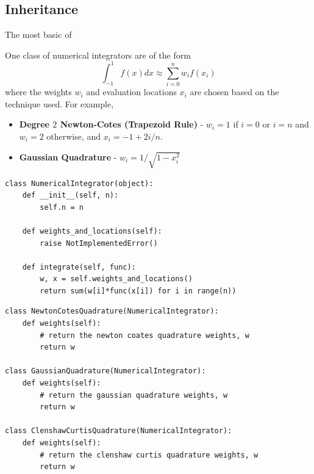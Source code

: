 \begin{lstlisting}
\end{lstlisting}


\subsection{Inheritance}

The most basic of

One class of numerical integrators are of the form
\[
  \int_{-1}^1 f(x) dx \approx \sum_{i=0}^n w_i f(x_i)
\]
where the weights $w_i$ and evaluation locations $x_i$ are chosen based on the
technique used. For example,
\begin{itemize}
\item {\bf Degree $2$ Newton-Cotes (Trapezoid Rule)} - $w_i = 1$ if $i=0$ or
  $i=n$ and $w_i = 2$ otherwise, and $x_i = -1 + 2i/n$.
  \item {\bf Gaussian Quadrature} - $w_i = 1/\sqrt{1-x_i^2}$
\end{itemize}

\begin{lstlisting}
class NumericalIntegrator(object):
    def __init__(self, n):
        self.n = n

    def weights_and_locations(self):
        raise NotImplementedError()

    def integrate(self, func):
        w, x = self.weights_and_locations()
        return sum(w[i]*func(x[i]) for i in range(n))
\end{lstlisting}


\begin{lstlisting}
class NewtonCotesQuadrature(NumericalIntegrator):
    def weights(self):
        # return the newton coates quadrature weights, w
        return w

class GaussianQuadrature(NumericalIntegrator):
    def weights(self):
        # return the gaussian quadrature weights, w
        return w

class ClenshawCurtisQuadrature(NumericalIntegrator):
    def weights(self):
        # return the clenshaw curtis quadrature weights, w
        return w
         
\end{lstlisting}



